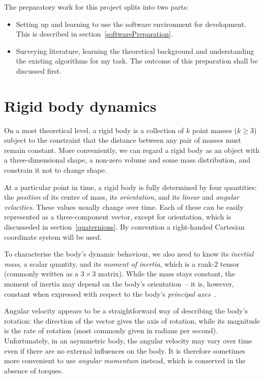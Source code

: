 The preparatory work for this project splits into two parts:
\begin{itemize}
\item Setting up and learning to use the software environment for development. This is described
    in section~\ref{softwarePreparation}.
\item Surveying literature, learning the theoretical background and understanding the existing
    algorithms for my task. The outcome of this preparation shall be discussed first.
\end{itemize}

\section{Rigid body dynamics}
On a most theoretical level, a rigid body is a collection of $k$ point masses ($k \ge 3$) subject
to the constraint that the distance between any pair of masses must remain constant. More
conveniently, we can regard a rigid body as an object with a three-dimensional shape, a non-zero
volume and some mass distribution, and constrain it not to change shape.

At a particular point in time, a rigid body is fully determined by four quantities: the
\emph{position} of its centre of mass, its \emph{orientation}, and its \emph{linear} and
\emph{angular velocities}. These values usually change over time. Each of these can be easily
represented as a three-component vector, except for orientation, which is discusseded in
section~\ref{quaternions}. By convention a right-handed Cartesian coordinate system will be used.

To characterise the body's dynamic behaviour, we also need to know its \emph{inertial mass},
a scalar quantity, and its \emph{moment of inertia}, which is a rank-2 tensor (commonly written
as a $3\times3$ matrix). While the mass stays constant, the moment of inertia may
depend on the body's orientation~-- it is, however, constant when expressed with respect to the
body's \emph{principal axes}~\cite{Feynman:63,Goldstein:80}.

Angular velocity appears to be a straightforward way of describing the body's rotation: the
direction of the vector gives the axis of rotation, while its magnitude is the rate of rotation
(most commonly given in radians per second). Unfortunately, in an asymmetric body, the angular
velocity may vary over time even if there are no external influences on the body. It is therefore
sometimes more convenient to use \emph{angular momentum} instead, which is conserved in the
absence of torques.

